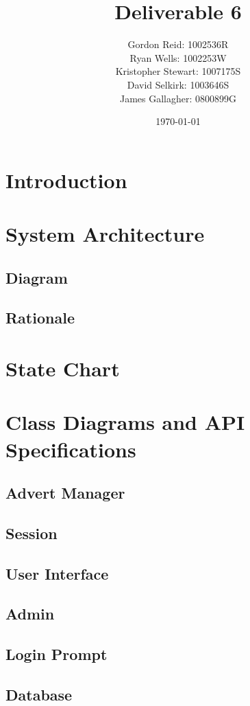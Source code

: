 \documentclass[12pt]{article}
\title{Deliverable 6}
\author{
    Gordon Reid: 1002536R\\
    Ryan Wells: 1002253W\\
    Kristopher Stewart: 1007175S\\
    David Selkirk: 1003646S\\
    James Gallagher: 0800899G\\
}
\date{\today}
\begin{document}
\maketitle

\newpage

\tableofcontents

\newpage

\section{Introduction}

\newpage

\section{System Architecture}

\subsection{Diagram}

\subsection{Rationale}

\newpage

\section{State Chart}

\newpage

\section{Class Diagrams and API Specifications}

\subsection{Advert Manager}

\subsection{Session}

\subsection{User Interface}

\subsection{Admin}

\subsection{Login Prompt}

\subsection{Database}
\end{document}

